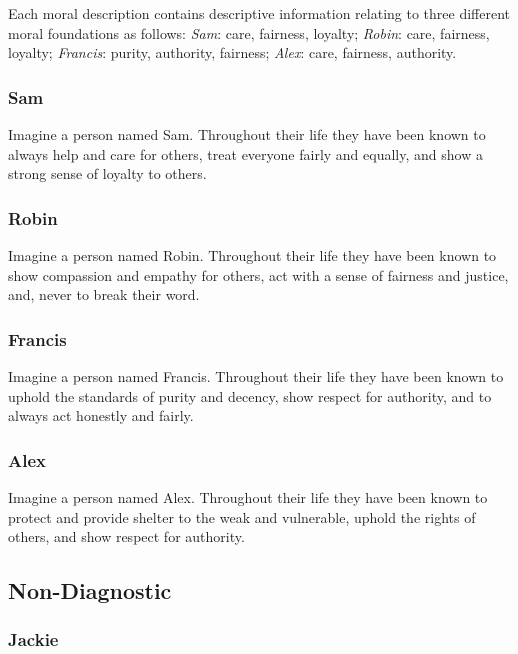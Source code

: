 \documentclass[
  american,
  man,floatsintext]{apa7}
\begin{document}
Each moral description contains descriptive information relating to three different moral foundations as follows: \emph{Sam}: care, fairness, loyalty; \emph{Robin}: care, fairness, loyalty; \emph{Francis}: purity, authority, fairness; \emph{Alex}: care, fairness, authority.

\hypertarget{sam-1}{%
\subsubsection{Sam}\label{sam-1}}

Imagine a person named Sam.
Throughout their life they have been known to always help and care for others, treat everyone fairly and equally, and show a strong sense of loyalty to others.

\hypertarget{robin-1}{%
\subsubsection{Robin}\label{robin-1}}

Imagine a person named Robin.
Throughout their life they have been known to show compassion and empathy for others, act with a sense of fairness and justice, and, never to break their word.

\hypertarget{francis-1}{%
\subsubsection{Francis}\label{francis-1}}

Imagine a person named Francis.
Throughout their life they have been known to uphold the standards of purity and decency, show respect for authority, and to always act honestly and fairly.

\hypertarget{alex-1}{%
\subsubsection{Alex}\label{alex-1}}

Imagine a person named Alex.
Throughout their life they have been known to protect and provide shelter to the weak and vulnerable, uphold the rights of others, and show respect for authority.

\hypertarget{non-diagnostic}{%
\subsection{Non-Diagnostic}\label{non-diagnostic}}

\hypertarget{jackie-1}{%
\subsubsection{Jackie}\label{jackie-1}}
\end{document}
